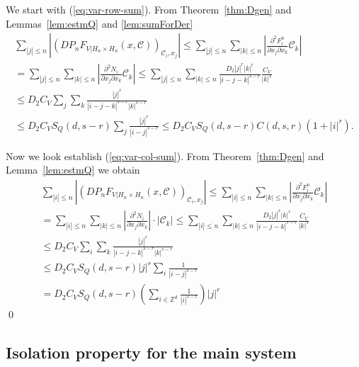 We start with (\ref{eq:var-row-sum}). From Theorem~\ref{thm:Dgen} and Lemmas~\ref{lem:estmQ}  and \ref{lem:sumForDer}
\begin{eqnarray*}
  \sum_{|j| \leq n}\left|   \left(DP_nF_{V|H_n \times H_n}(x,\mathcal{C})\right)_{\mathcal{C}_i,x_j} \right| \leq \sum_{|j|\leq n}  \sum_{|k|\leq n}\left|\frac{\partial^2 F^n_i}{\partial x_j\partial x_k}\mathcal{C}_k \right| \\
  = \sum_{|j|\leq n}  \sum_{|k|\leq n}\left|\frac{\partial^2 N_i}{\partial x_j\partial x_k}\mathcal{C}_k \right| \leq
  \sum_{|j|\leq n}  \sum_{|k|\leq n}  \frac{D_2 |j|^r |k|^r}{|i-j-k|^{s-r}} \frac{C_V}{|k|^s} \\
    \leq  D_2 C_V \sum_{j}  \sum_{k}  \frac{|j|^r }{|i-j-k|^{s-r} |k|^{s-r}} \\
    \leq D_2 C_V S_Q(d,s-r)  \sum_{j} \frac{|j|^r}{|i-j|^{s-r}} \leq D_2C_V S_Q(d,s-r)  C(d,s,r)(1+|i|^r).
\end{eqnarray*}

Now we look establish (\ref{eq:var-col-sum}). From Theorem~\ref{thm:Dgen} and Lemma~\ref{lem:estmQ}   we obtain
\begin{eqnarray*}
  \sum_{|i| \leq n}\left|   \left(DP_nF_{V|H_n \times H_n}(x,\mathcal{C})\right)_{\mathcal{C}_i,x_j} \right| \leq \sum_{|i|\leq n} \sum_{|k|\leq n}\left|\frac{\partial^2 F^n_i}{\partial x_j\partial x_k}\mathcal{C}_k\right| \\
  =\sum_{|i|\leq n} \sum_{|k|\leq n}\left|\frac{\partial^2 N_i}{\partial x_j\partial x_k} \right| \cdot  |\mathcal{C}_k|  \leq \sum_{|i|\leq n} \sum_{|k|\leq n} \frac{D_2 |j|^r |k|^r}{|i-j-k|^{s-r}} \frac{C_V}{|k|^s} \\
  \leq D_2 C_V \sum_{i} \sum_{k} \frac{|j|^r }{|i-j-k|^{s-r} |k|^{s-r}} \\
  \leq  D_2 C_V S_Q(d,s-r) |j|^r \sum_{i}  \frac{1}{|i-j|^{s-r}}\\
  =D_2 C_V S_Q(d,s-r)\left( \sum_{i \in \mathbb{Z}^d}  \frac{1}{|i|^{s-r}} \right) |j|^r
\end{eqnarray*}
\qed



\subsection{Isolation property for the main system }
\label{subsec:iso-main-var}

